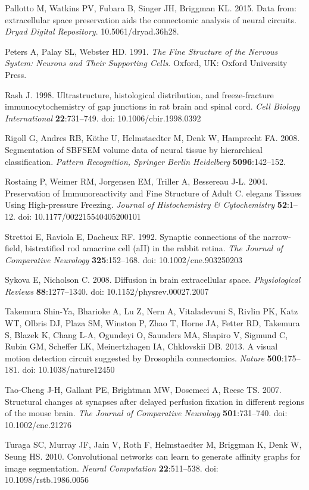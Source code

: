\documentclass{article}
\begin{document}
\begin{hangpars}
Pallotto M, Watkins PV, Fubara B, Singer JH, Briggman KL. 2015. Data from: extracellular space preservation aids the connectomic analysis of neural circuits. \emph{Dryad Digital Repository}. 10.5061/dryad.36h28.

Peters A, Palay SL, Webster HD. 1991. \emph{The Fine Structure of the Nervous System: Neurons and Their Supporting Cells}. Oxford, UK: Oxford University Press.

Rash J. 1998. Ultrastructure, histological distribution, and freeze-fracture immunocytochemistry of gap junctions in rat brain and spinal cord. \emph{Cell Biology International} \textbf{22}:731–749. doi: 10.1006/cbir.1998.0392

Rigoll G, Andres RB, Köthe U, Helmstaedter M, Denk W, Hamprecht FA. 2008. Segmentation of SBFSEM volume data of neural tissue by hierarchical classification. \emph{Pattern Recognition, Springer Berlin Heidelberg} \textbf{5096}:142–152.

Rostaing P, Weimer RM, Jorgensen EM, Triller A, Bessereau J-L. 2004. Preservation of Immunoreactivity and Fine Structure of Adult C. elegans Tissues Using High-pressure Freezing. \emph{Journal of Histochemistry \& Cytochemistry} \textbf{52}:1–12. doi: 10.1177/002215540405200101

Strettoi E, Raviola E, Dacheux RF. 1992. Synaptic connections of the narrow-field, bistratified rod amacrine cell (aII) in the rabbit retina. \emph{The Journal of Comparative Neurology} \textbf{325}:152–168. doi: 10.1002/cne.903250203

Sykova E, Nicholson C. 2008. Diffusion in brain extracellular space. \emph{Physiological Reviews} \textbf{88}:1277–1340. doi: 10.1152/physrev.00027.2007

Takemura Shin-Ya, Bharioke A, Lu Z, Nern A, Vitaladevuni S, Rivlin PK, Katz WT, Olbris DJ, Plaza SM, Winston P, Zhao T, Horne JA, Fetter RD, Takemura S, Blazek K, Chang L-A, Ogundeyi O, Saunders MA, Shapiro V, Sigmund C, Rubin GM, Scheffer LK, Meinertzhagen IA, Chklovskii DB. 2013. A visual motion detection circuit suggested by Drosophila connectomics. \emph{Nature} \textbf{500}:175–181. doi: 10.1038/nature12450

Tao-Cheng J-H, Gallant PE, Brightman MW, Dosemeci A, Reese TS. 2007. Structural changes at synapses after delayed perfusion fixation in different regions of the mouse brain. \emph{The Journal of Comparative Neurology} \textbf{501}:731–740. doi: 10.1002/cne.21276

Turaga SC, Murray JF, Jain V, Roth F, Helmstaedter M, Briggman K, Denk W, Seung HS. 2010. Convolutional networks can learn to generate affinity graphs for image segmentation. \emph{Neural Computation} \textbf{22}:511–538. doi: 10.1098/rstb.1986.0056


\end{hangpars}
\end{document}
